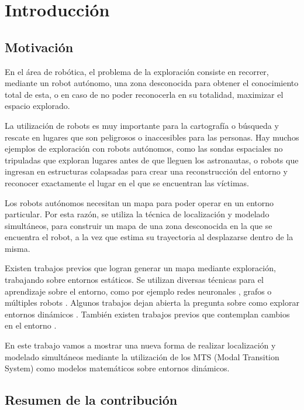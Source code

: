 \chapter{Introducción}

\section{Motivación}

En el área de robótica, el problema de la exploración consiste en recorrer, mediante un robot autónomo, una zona 
desconocida para obtener el conocimiento total de esta, o en caso de no poder reconocerla en su totalidad, maximizar 
el espacio explorado. 


La utilización de robots es muy importante para la cartografía o búsqueda y rescate en lugares que son peligrosos o 
inaccesibles para las personas. Hay muchos ejemplos de exploración con robots autónomos, como las sondas espaciales 
no tripuladas que exploran lugares antes de que lleguen los astronautas, o robots que ingresan en estructuras colapsadas 
para crear una reconstrucción del entorno y reconocer exactamente el lugar en el que se encuentran las víctimas.


Los robots autónomos necesitan un mapa para poder operar en un entorno particular. Por esta razón, se utiliza la técnica 
de localización y modelado simultáneos, para construir un mapa de una zona desconocida en la que se encuentra el robot, 
a la vez que estima su trayectoria al desplazarse dentro de la misma.


Existen trabajos previos que logran generar un mapa mediante exploración, trabajando sobre entornos estáticos. 
Se utilizan diversas técnicas para el aprendizaje sobre el entorno, como por ejemplo redes neuronales \cite{TP2}, 
grafos \cite{TP4} o múltiples robots \cite{TP5}. Algunos trabajos dejan abierta la pregunta sobre como explorar 
entornos dinámicos \cite{TP1} \cite{TP3}. También existen trabajos previos que contemplan cambios en el entorno \cite{TP6}.


En este trabajo vamos a mostrar una nueva forma de realizar localización y modelado simultáneos mediante la utilización 
de los MTS (Modal Transition System) como modelos matemáticos sobre entornos dinámicos.

\section{Resumen de la contribución}

